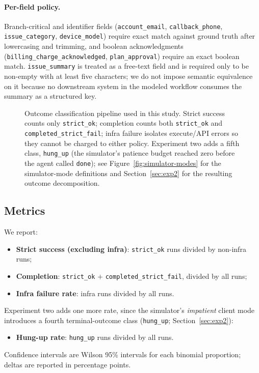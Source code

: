 \documentclass[11pt,a4paper]{article}
\begin{document}
\paragraph{Per-field policy.}
Branch-critical and identifier fields (\texttt{account\_email}, \texttt{callback\_phone}, \texttt{issue\_category}, \texttt{device\_model}) require exact match against ground truth after lowercasing and trimming, and boolean acknowledgments (\texttt{billing\_charge\_acknowledged}, \texttt{plan\_approval}) require an exact boolean match. \texttt{issue\_summary} is treated as a free-text field and is required only to be non-empty with at least five characters; we do not impose semantic equivalence on it because no downstream system in the modeled workflow consumes the summary as a structured key.

\begin{figure}[htbp]
  \centering
  \resizebox{\linewidth}{!}{}
  \caption{Outcome classification pipeline used in this study. Strict success counts only \texttt{strict\_ok}; completion counts both \texttt{strict\_ok} and \texttt{completed\_strict\_fail}; infra failure isolates execute/API errors so they cannot be charged to either policy. Experiment two adds a fifth class, \texttt{hung\_up} (the simulator's patience budget reached zero before the agent called \texttt{done}); see Figure~\ref{fig:simulator-modes} for the simulator-mode definitions and Section~\ref{sec:exp2} for the resulting outcome decomposition.}
  \label{fig:outcomes}
\end{figure}

\subsection{Metrics}

We report:
\begin{itemize}[noitemsep,leftmargin=2em]
    \item \textbf{Strict success (excluding infra)}: \texttt{strict\_ok} runs divided by non-infra runs;
    \item \textbf{Completion}: \texttt{strict\_ok} $+$ \texttt{completed\_strict\_fail}, divided by all runs;
    \item \textbf{Infra failure rate}: infra runs divided by all runs.
\end{itemize}
Experiment two adds one more rate, since the simulator's \emph{impatient} client mode introduces a fourth terminal-outcome class (\texttt{hung\_up}; Section~\ref{sec:exp2}):
\begin{itemize}[noitemsep,leftmargin=2em]
    \item \textbf{Hung-up rate}: \texttt{hung\_up} runs divided by all runs.
\end{itemize}
Confidence intervals are Wilson 95\% intervals for each binomial proportion; deltas are reported in percentage points.
\end{document}
